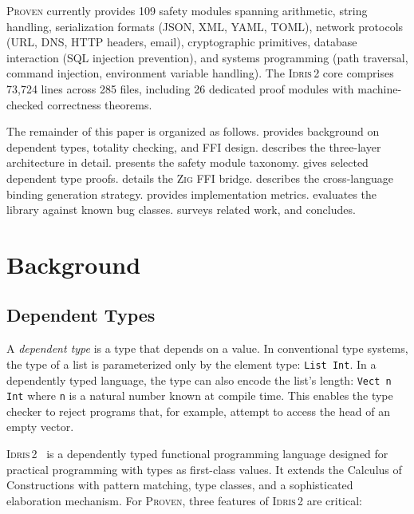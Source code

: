 \documentclass[11pt,a4paper]{article}
\newcommand{\proven}{\textsc{Proven}}
\newcommand{\idris}{\textsc{Idris\,2}}
\newcommand{\zig}{\textsc{Zig}}
\newcommand{\code}[1]{\texttt{#1}}
\begin{document}
\proven{} currently provides 109 safety modules spanning arithmetic,
string handling, serialization formats (JSON, XML, YAML, TOML), network
protocols (URL, DNS, HTTP headers, email), cryptographic primitives,
database interaction (SQL injection prevention), and systems programming
(path traversal, command injection, environment variable handling). The
\idris{} core comprises 73,724 lines across 285 files, including 26
dedicated proof modules with machine-checked correctness theorems.

The remainder of this paper is organized as follows.
 provides background on dependent types, totality
checking, and FFI design.  describes the
three-layer architecture in detail.  presents the
safety module taxonomy.  gives selected dependent type
proofs.  details the \zig{} FFI bridge.
 describes the cross-language binding generation
strategy.  provides implementation metrics.
 evaluates the library against known bug classes.
 surveys related work, and 
concludes.


\section{Background}
\label{sec:background}

\subsection{Dependent Types}
\label{sec:dependent-types}

A \emph{dependent type} is a type that depends on a value. In conventional
type systems, the type of a list is parameterized only by the element type:
\code{List Int}. In a dependently typed language, the type can also encode
the list's length: \code{Vect n Int} where \code{n} is a natural number
known at compile time. This enables the type checker to reject programs
that, for example, attempt to access the head of an empty vector.

\idris{}~\cite{brady2021idris2} is a dependently typed functional
programming language designed for practical programming with types as
first-class values. It extends the Calculus of Constructions with pattern
matching, type classes, and a sophisticated elaboration mechanism. For
\proven{}, three features of \idris{} are critical:
\end{document}
